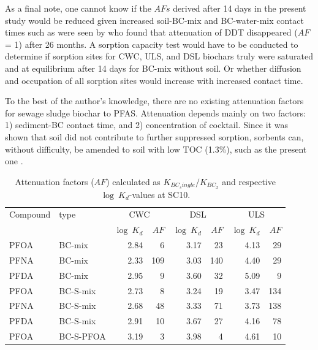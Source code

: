 As a final note, one cannot know if the $AFs$ derived after 14 days in the present study would be reduced given increased soil-BC-mix and BC-water-mix contact times such as were seen by \cite{hale2009sorption} who found that attenuation of DDT disappeared ($AF$ = 1) after 26 months. A sorption capacity test would have to be conducted to determine if sorption sites for CWC, ULS, and DSL biochars truly were saturated and at equilibrium after 14 days for BC-mix without soil. Or whether diffusion and occupation of all sorption sites would increase with increased contact time. 

To the best of the author's knowledge, there are no existing attenuation factors for sewage sludge biochar to PFAS. Attenuation depends mainly on two factors: 1) sediment-BC contact time, and 2) concentration of cocktail. Since it was shown that soil did not contribute to further suppressed sorption, sorbents can, without difficulty, be amended to soil with low TOC (1.3\%), such as the present one \citep{Sormo2021}.


\begin{table}
\centering
\caption{Attenuation factors ($AF$) calculated as $K_{BC_single}/K_{BC_x}$ and respective $\log~K_d$-values at SC10.}
\label{tab:attenuation}
\begin{tabular}{llrrrrrr} \toprule
Compound & type & \multicolumn{2}{c}{CWC} & \multicolumn{2}{c}{DSL} & \multicolumn{2}{c}{ULS} \\ \cmidrule(l){3-4} \cmidrule(l){5-6} \cmidrule(l){7-8}
 &  & $\log~K_d$ & $AF$ & $\log~K_d$ & $AF$ & $\log~K_d$ & $AF$ \\ \midrule
PFOA & BC-mix & 2.84 & 6 & 3.17 & 23 & 4.13 & 29 \\
PFNA & BC-mix & 2.33 & 109 & 3.03 & 140 & 4.40 & 29 \\
PFDA & BC-mix & 2.95 & 9 & 3.60 & 32 & 5.09 & 9 \\ \addlinespace \hline \addlinespace
PFOA & BC-S-mix & 2.73 & 8 & 3.24 & 19 & 3.47 & 134 \\
PFNA & BC-S-mix & 2.68 & 48 & 3.33 & 71 & 3.73 & 138 \\
PFDA & BC-S-mix & 2.91 & 10 & 3.67 & 27 & 4.16 & 78 \\ \addlinespace \hline \addlinespace
PFOA & BC-S-PFOA & 3.19 & 3 & 3.98 & 4 & 4.61 & 10 \\ \bottomrule
\end{tabular}
\end{table}


